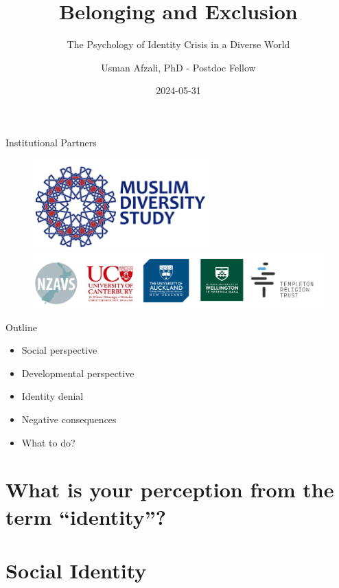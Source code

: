 \documentclass[
  ignorenonframetext,
  aspectratio=169,
]{beamer}
\title{Belonging and Exclusion}
\subtitle{The Psychology of Identity Crisis in a Diverse World}
\author{Usman Afzali, PhD - Postdoc Fellow}
\date{2024-05-31}
\institute{Uni of Canterbury}
\providecommand{\tightlist}{%
  \setlength{\itemsep}{0pt}\setlength{\parskip}{0pt}}\usepackage{longtable,booktabs,array}
\begin{document}
\frame{\titlepage}

\begin{frame}{Institutional Partners}
\label{institutional-partners}
\begin{figure}

\begin{minipage}{\linewidth}
\begin{center}
\includegraphics[width=0.6\textwidth,height=\textheight]{figs/mds.png}
\end{center}
\includegraphics{figs/sponsors.png}\end{minipage}%

\end{figure}%
\end{frame}

\begin{frame}{Outline}
\label{outline}
\begin{itemize}
\tightlist
\item
  Social perspective
\item
  Developmental perspective
\item
  Identity denial
\item
  Negative consequences
\item
  What to do?
\end{itemize}
\end{frame}

\section{What is your perception from the term
``identity''?}\label{what-is-your-perception-from-the-term-identity}

\section{Social Identity}\label{social-identity}
\end{document}
